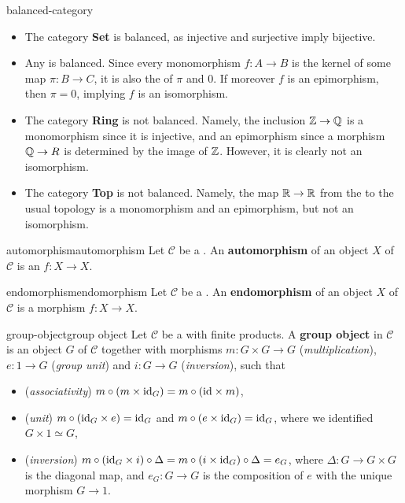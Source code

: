 \begin{example}{balanced-category}
    \begin{itemize}
        \item The category \textbf{Set} is balanced, as injective and surjective imply bijective.
        
        \item Any  is balanced. Since every monomorphism $f : A \to B$ is the kernel of some map $\pi : B \to C$, it is also the  of $\pi$ and $0$. If moreover $f$ is an epimorphism, then $\pi = 0$, implying $f$ is an isomorphism.
    
        \item The category \textbf{Ring} is not balanced. Namely, the inclusion $\mathbb{Z} \to \mathbb{Q}$ is a monomorphism since it is injective, and an epimorphism since a morphism $\mathbb{Q} \to R$ is determined by the image of $\mathbb{Z}$. However, it is clearly not an isomorphism.
    
        \item The category \textbf{Top} is not balanced. Namely, the map $\mathbb{R} \to \mathbb{R}$ from the  to the usual topology is a monomorphism and an epimorphism, but not an isomorphism.
    \end{itemize}
\end{example}

\begin{topic}{automorphism}{automorphism}
    Let $\mathcal{C}$ be a . An \textbf{automorphism} of an object $X$ of $\mathcal{C}$ is an  $f : X \to X$.
\end{topic}

\begin{topic}{endomorphism}{endomorphism}
    Let $\mathcal{C}$ be a . An \textbf{endomorphism} of an object $X$ of $\mathcal{C}$ is a morphism $f : X \to X$.
\end{topic}

\begin{topic}{group-object}{group object}
    Let $\mathcal{C}$ be a  with finite products. A \textbf{group object} in $\mathcal{C}$ is an object $G$ of $\mathcal{C}$ together with morphisms $m : G \times G \to G$ (\textit{multiplication}), $e : 1 \to G$ (\textit{group unit}) and $i : G \to G$ (\textit{inversion}), such that
    \begin{itemize}
        \item (\textit{associativity}) $m \circ (m \times \text{id}_G) = m \circ (\text{id} \times m)$,
        \item (\textit{unit}) $m \circ (\text{id}_G \times e) = \text{id}_G$ and $m \circ (e \times \text{id}_G) = \text{id}_G$, where we identified $G \times 1 \simeq G$,
        \item (\textit{inversion}) $m \circ (\text{id}_G \times i) \circ \Delta = m \circ (i \times \text{id}_G) \circ \Delta = e_G$, where $\Delta : G \to G \times G$ is the diagonal map, and $e_G : G \to G$ is the composition of $e$ with the unique morphism $G \to 1$.
    \end{itemize}
\end{topic}

